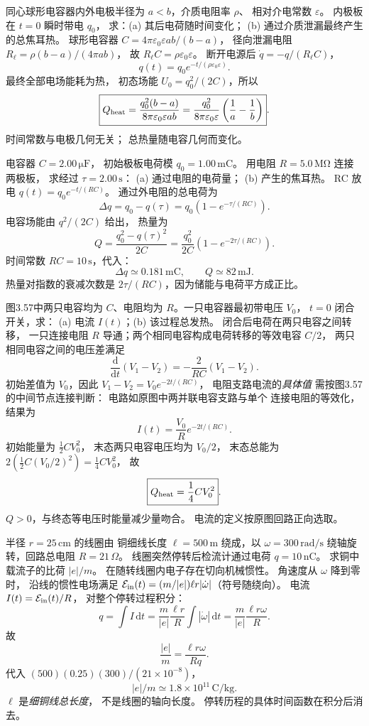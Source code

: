 同心球形电容器内外电极半径为
$a<b$，介质电阻率 $\rho$、
相对介电常数 $\varepsilon$。
内极板在 $t=0$ 瞬时带电 $q_0$，
求：(a) 其后电荷随时间变化；
(b) 通过介质泄漏最终产生的总焦耳热。
\exsolution
球形电容器
$C=4\pi\varepsilon_0\varepsilon ab/(b-a)$，
径向泄漏电阻
$R_\ell=\rho(b-a)/(4\pi ab)$，
故
$R_\ell C=\rho\varepsilon_0\varepsilon$。
断开电源后
$\dot q=-q/(R_\ell C)$，
\[
\boxed{q(t)=q_0
e^{-t/(\rho\varepsilon_0\varepsilon)}}.
\]
最终全部电场能耗为热，
初态场能
$U_0=q_0^2/(2C)$，所以
\[
\boxed{Q_{\rm heat}=
\frac{q_0^2(b-a)}
{8\pi\varepsilon_0\varepsilon ab}
=\frac{q_0^2}{8\pi\varepsilon_0\varepsilon}
\left(\frac1a-\frac1b\right)}.
\]
\excheck 时间常数与电极几何无关；
总热量随电容几何而变化。

电容器 $C=2.00\,\mathrm{\mu F}$，
初始极板电荷模
$q_0=1.00\,\mathrm{mC}$。
用电阻 $R=5.0\,\mathrm{M\Omega}$ 连接两极板，
求经过 $\tau=2.00\,\mathrm s$：
(a) 通过电阻的电荷量；
(b) 产生的焦耳热。
\exsolution
RC 放电
$q(t)=q_0e^{-t/(RC)}$。
通过外电阻的总电荷为
\[
\boxed{\Delta q=q_0-q(\tau)
=q_0(1-e^{-\tau/(RC)})}.
\]
电容场能由 $q^2/(2C)$ 给出，
热量为
\[
\boxed{Q=
\frac{q_0^2-q(\tau)^2}{2C}
=\frac{q_0^2}{2C}
(1-e^{-2\tau/(RC)})}.
\]
时间常数 $RC=10\,\mathrm s$，代入：
\[
\boxed{\Delta q\simeq0.181\,\mathrm{mC}},
\qquad
\boxed{Q\simeq82\,\mathrm{mJ}}.
\]
\excheck 热量对指数的衰减次数是
$2\tau/(RC)$，因为储能与电荷平方成正比。

图3.57中两只电容均为 $C$、电阻均为
$R$。一只电容器最初带电压 $V_0$，
$t=0$ 闭合开关，求：
(a) 电流 $I(t)$；(b) 该过程总发热。
\exsolution
闭合后电荷在两只电容之间转移，
一只连接电阻 $R$ 导通；两个相同电容构成电荷转移的等效电容 $C/2$，
两只相同电容之间的电压差满足
\[
\frac{\mathrm d}{\mathrm dt}(V_1-V_2)
=-\frac{2}{RC}(V_1-V_2).
\]
初始差值为 $V_0$，因此
$V_1-V_2=V_0e^{-2t/(RC)}$，
电阻支路电流的\emph{具体值}
需按图3.57的中间节点连接判断：
电路如原图中两并联电容支路与单个
连接电阻的等效化，结果为
\[
\boxed{I(t)=\frac{V_0}{R}e^{-2t/(RC)}}.
\]
初始能量为 $\frac12CV_0^2$，
末态两只电容电压均为 $V_0/2$，
末态总能为
$2(\frac12C(V_0/2)^2)=\frac14CV_0^2$，
故
\[
\boxed{Q_{\rm heat}=\frac14CV_0^2}.
\]
\excheck $Q>0$，与终态等电压时能量减少量吻合。
电流的定义按原图回路正向选取。

半径 $r=25\,\mathrm{cm}$ 的线圈由
铜细线长度 $\ell=500\,\mathrm m$
绕成，以 $\omega=300\,\mathrm{rad/s}$
绕轴旋转，回路总电阻
$R=21\,\Omega$。
线圈突然停转后检流计通过电荷
$q=10\,\mathrm{nC}$。
求铜中载流子的比荷 $|e|/m$。
\exsolution
在随转线圈内电子存在切向机械惯性。
角速度从 $\omega$ 降到零时，
沿线的惯性电场满足
$\mathcal E_{\rm in}(t)=(m/|e|)\ell r
|\dot\omega|$（符号随绕向）。
电流 $I(t)=\mathcal E_{\rm in}(t)/R$，
对整个停转过程积分：
\[
q=\int I\,\mathrm dt
=\frac{m}{|e|}\frac{\ell r}{R}
\int|\dot\omega|\,\mathrm dt
=\frac{m}{|e|}\frac{\ell r\omega}{R}.
\]
故
\[
\boxed{\frac{|e|}{m}=
\frac{\ell r\omega}{Rq}}.
\]
代入
$(500)(0.25)(300)/(21\times10^{-8})$，
\[
\boxed{|e|/m\simeq1.8\times10^{11}\,\mathrm{C/kg}}.
\]
\excheck $\ell$ 是\emph{细铜线总长度}，
不是线圈的轴向长度。
停转历程的具体时间函数在积分后消去。

